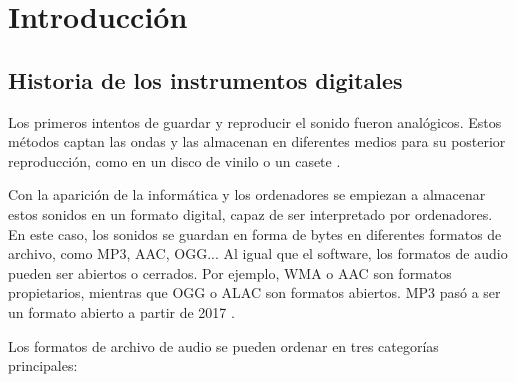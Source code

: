 
\chapter{Introducción} %
\label{cha:Introduccion}

    \section{Historia de los instrumentos digitales} %
    \label{sec:HistoriaDeLosInstrumentosDigitales}

        Los primeros intentos de guardar y reproducir el sonido fueron analógicos. Estos métodos captan las ondas y las
        almacenan en diferentes medios para su posterior reproducción, como en un disco de vinilo o un casete
        \cite{historia_instrumentos_digitales}.

        Con la aparición de la informática y los ordenadores se empiezan a almacenar estos sonidos en un formato
        digital, capaz de ser interpretado por ordenadores. En este caso, los sonidos se guardan en forma de bytes en
        diferentes formatos de archivo, como MP3, AAC, OGG... Al igual que el software, los formatos de audio pueden ser
        abiertos o cerrados. Por ejemplo, WMA \cite{wikipedia_wma} o AAC \cite{wikipedia_aac} son formatos propietarios,
        mientras que OGG \cite{wikipedia_ogg} o ALAC \cite{wikipedia_alac} son formatos abiertos. MP3 pasó a ser un
        formato abierto a partir de 2017 \cite{mp3_licencia}.

        Los formatos de archivo de audio se pueden ordenar en tres categorías principales:

        \begin{table}[]
            \caption{Tabla con ejemplos de formatos de las tres categorías \cite{formatos_audio}}
            \label{tab:my-table}
        \end{table}

